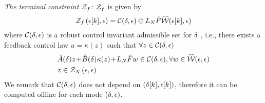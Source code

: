 \noindent\textit{The terminal constraint $\mathcal{Z}_{f}$:}
%
$\mathcal{Z}_{f}$ is given by %
\begin{equation}
\label{eq:RMPC1-Zf}
\mathcal{Z}_{f}\left(\epsilon[k],\epsilon\right)=\mathcal{C}(\delta,\epsilon)\ominus L_{N}\hat{F}\widehat{\mathcal{W}}(\epsilon[k],\epsilon)
\end{equation}
where $\mathcal{C}(\delta,\epsilon)$ is a robust control invariant admissible
set for $\delta$ \cite{kerrigan00rcs}, i.e., there exists a feedback control law $u=\kappa(z)$
such that $\forall z\in\mathcal{C}(\delta,\epsilon)$
\begin{eqnarray}
\label{eq:RMPC1-Zf-invariant}
& \hat{A}(\delta)z \!+\! \hat{B}(\delta)\kappa(z) \!+\! L_{N}\hat{F}w\in\mathcal{C}(\delta,\epsilon), \forall w\in\widehat{\mathcal{W}}(\epsilon,\epsilon)\label{eq:RMPC1-Zf-invariant-dyn}\\
& z\in\mathcal{Z}_{N}\left(\epsilon,\epsilon\right)\label{eq:RMPC1-Zf-invariant-z}
\end{eqnarray}
We remark that $\mathcal{C}(\delta,\epsilon)$ does not depend on $\left(\delta[k],\epsilon[k]\right)$, therefore it can be computed offline for each mode $\left(\delta,\epsilon\right)$.
